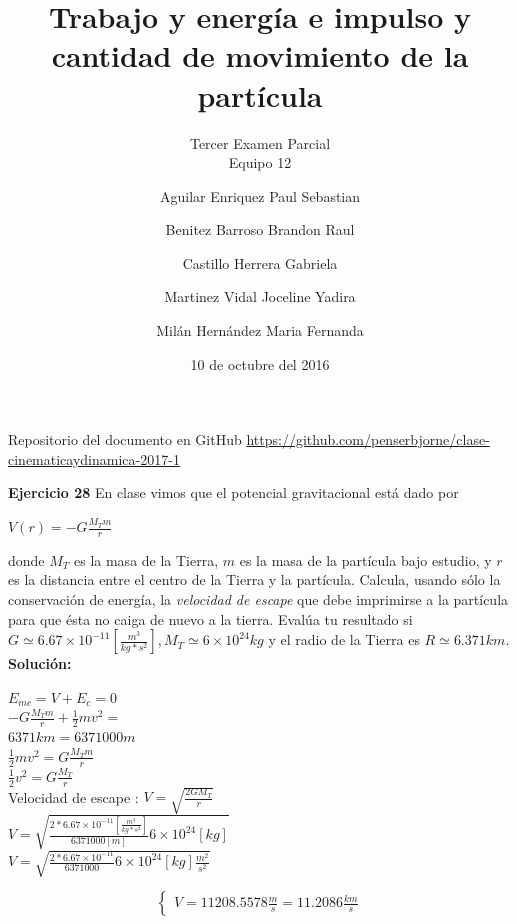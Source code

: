 \documentclass[a4paper,11pt]{scrartcl}
\title{Trabajo y energía e impulso y cantidad de movimiento de la partícula}
\subtitle{Tercer Examen Parcial \\ Equipo 12}
\author{
  Aguilar Enriquez Paul Sebastian\\
  \and
  Benitez Barroso Brandon Raul\\
  \and
  Castillo Herrera Gabriela\\
  \and
  Martinez Vidal Joceline Yadira\\
  \and
  Milán Hernández Maria Fernanda
  }
\date{10 de octubre del 2016}
\begin{document}
\maketitle

\begin{center}
  Repositorio del documento en GitHub
  \url{https://github.com/penserbjorne/clase-cinematicaydinamica-2017-1}
\end{center}

\textbf{Ejercicio 28} En clase vimos que el potencial gravitacional está dado por\\
\begin{center}
  $V(r) = -G \frac{M_T m}{r}$
\end{center}

donde $M_T$ es la masa de la Tierra, $m$ es la masa de la partícula bajo estudio, y $r$ es la distancia entre el centro de la Tierra y la partícula. Calcula, usando sólo la conservación de energía, la \textit{velocidad de escape} que debe imprimirse a la partícula para que ésta no caiga de nuevo a la tierra. Evalúa tu resultado si $G \simeq 6.67 \times 10^{-11} [\frac{m^3}{kg*s^2}], M_T \simeq 6 \times 10^24 kg$ y el radio de la Tierra es $R \simeq 6.371 km$.\\

\textbf{Solución:}

\begin{center}

$E_{mc} = V + E_c = 0$\\
\hfill \break
$-G\frac{M_T m}{r} + \frac{1}{2} m v^2 = $\\
\hfill \break
$6 371 km = 6 371 000 m$\\
\hfill \break
$\frac{1}{2} m v^2 = G\frac{M_T m}{r}$\\
\hfill \break
$\frac{1}{2} v^2 = G\frac{M_T}{r}$\\
\hfill \break
Velocidad de escape : $V = \sqrt{\frac{2 G M_T}{r}}$\\
\hfill \break
$V = \sqrt{\frac{2 * 6.67\times10^{-11}[\frac{m^3}{kg*s^2}]}{6 371 000 [m]} 6\times10^{24}[kg]}$\\
\hfill \break
$V = \sqrt{\frac{2 * 6.67\times10^{-11}}{6 371 000} 6\times10^{24}[kg] \frac{m^2}{s^2}}$\\
\hfill \break

\begin{equation}
  \left\lbrace
  \begin{array}{l}
    V = 11208.5578 \frac{m}{s} = 11.2086 \frac{km}{s}
  \end{array}
  \right.
\end{equation}

 
\end{center}
\end{document}
